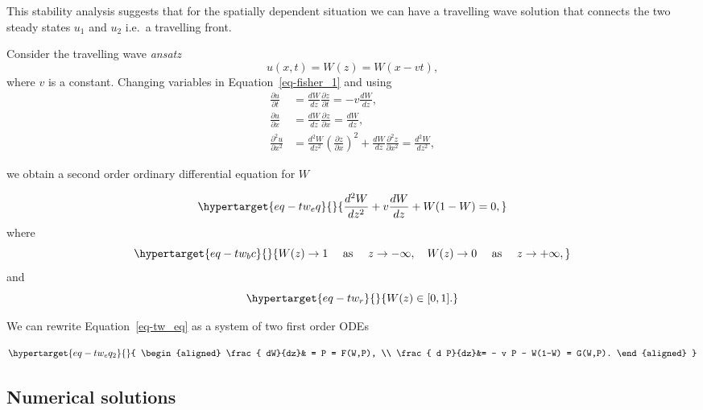 \documentclass[
  letterpaper,
  DIV=11,
  numbers=noendperiod]{scrreprt}
\theoremstyle{plain}
\theoremstyle{definition}
\theoremstyle{plain}
\theoremstyle{remark}
\begin{document}
This stability analysis suggests that for the spatially dependent
situation we can have a travelling wave solution that connects the two
steady states \(u_1\) and \(u_2\) i.e.~a travelling front.

Consider the travelling wave \emph{ansatz}\\
\[
u(x,t)= W(z) = W(x-vt),
\] where \(v\) is a constant. Changing variables in
Equation~\ref{eq-fisher_1} and using \[
\begin{aligned}
\frac{ \partial u}{\partial t} &= \frac{ dW}{dz} \frac{\partial z}{\partial t} = - v   \frac{ dW}{dz}, \\
 \frac{ \partial u}{\partial x} &= \frac{ dW}{dz} \frac{\partial z}{\partial x} =\frac{ dW}{dz}, \\
 \frac{ \partial^2 u}{\partial x^2} &= \frac{ d^2W}{dz^2} \left(\frac{\partial z}{\partial x} \right)^2 +  \frac{ dW}{dz} \frac{\partial^2 z}{\partial x^2} =\frac{ d^2W}{dz^2},
\end{aligned}
\]

we obtain a second order ordinary differential equation for \(W\)

\begin{equation}\protect\hypertarget{eq-tw_eq}{}{
\frac{ d^2W}{dz^2}+  v \frac{ dW}{dz} + W(1-W)  = 0, 
}\label{eq-tw_eq}\end{equation} where
\begin{equation}\protect\hypertarget{eq-tw_bc}{}{
W(z) \to 1 \quad \text{ as } \quad z \to  - \infty, \quad 
W(z) \to 0 \quad \text{ as } \quad z \to  +\infty,
}\label{eq-tw_bc}\end{equation} and
\begin{equation}\protect\hypertarget{eq-tw_r}{}{
W(z) \in [0,1]. 
}\label{eq-tw_r}\end{equation}

We can rewrite Equation~\ref{eq-tw_eq} as a system of two first order
ODEs

\begin{equation}\protect\hypertarget{eq-tw_eq_2}{}{
\begin{aligned}
\frac{ dW}{dz}& = P  = F(W,P), \\
\frac{ d P}{dz}&= -  v P - W(1-W)  = G(W,P).  
\end{aligned}
}\label{eq-tw_eq_2}\end{equation}

\hypertarget{numerical-solutions-1}{%
\subsection{Numerical solutions}\label{numerical-solutions-1}}
\end{document}
